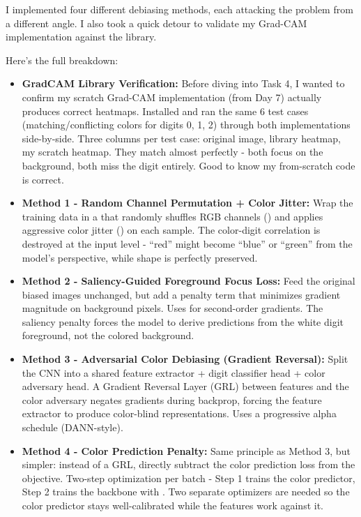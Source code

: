 \documentclass[9pt,a4paper,twocolumn,twoside]{tau-class/tau}
\begin{document}
        I implemented four different debiasing methods, each attacking the problem from a different angle. I also took a quick detour to validate my Grad-CAM implementation against the  library.

        Here's the full breakdown:

        \begin{itemize}
            \item \textbf{GradCAM Library Verification:} Before diving into Task 4, I wanted to confirm my scratch Grad-CAM implementation (from Day 7) actually produces correct heatmaps. Installed  and ran the same 6 test cases (matching/conflicting colors for digits 0, 1, 2) through both implementations side-by-side. Three columns per test case: original image, library heatmap, my scratch heatmap. They match almost perfectly - both focus on the background, both miss the digit entirely. Good to know my from-scratch code is correct.

            \item \textbf{Method 1 - Random Channel Permutation + Color Jitter:} Wrap the training data in a  that randomly shuffles RGB channels () and applies aggressive color jitter () on each sample. The color-digit correlation is destroyed at the input level - ``red'' might become ``blue'' or ``green'' from the model's perspective, while shape is perfectly preserved.

            \item \textbf{Method 2 - Saliency-Guided Foreground Focus Loss:} Feed the original biased images unchanged, but add a penalty term that minimizes gradient magnitude on background pixels. Uses  for second-order gradients. The saliency penalty forces the model to derive predictions from the white digit foreground, not the colored background.

            \item \textbf{Method 3 - Adversarial Color Debiasing (Gradient Reversal):} Split the CNN into a shared feature extractor + digit classifier head + color adversary head. A Gradient Reversal Layer (GRL) between features and the color adversary negates gradients during backprop, forcing the feature extractor to produce color-blind representations. Uses a progressive alpha schedule (DANN-style).

            \item \textbf{Method 4 - Color Prediction Penalty:} Same principle as Method 3, but simpler: instead of a GRL, directly subtract the color prediction loss from the objective. Two-step optimization per batch - Step 1 trains the color predictor, Step 2 trains the backbone with . Two separate optimizers are needed so the color predictor stays well-calibrated while the features work against it.
        \end{itemize}
\end{document}
